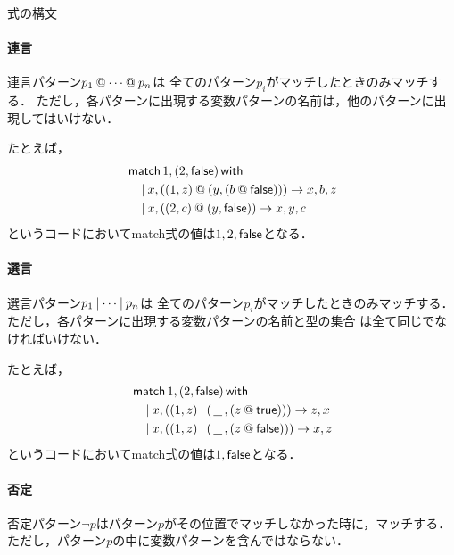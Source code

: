 \documentclass[a4paper,titlepage,report,disablejfam]{jsbook}
\begin{document}
\begin{resbonsiblesection}{式の構文}{\sakamoto}
\paragraph{連言}
連言パターン$p_1\mathbin{@} \cdots\mathbin{@} p_n$は
全てのパターン$p_i$がマッチしたときのみマッチする．
ただし，各パターンに出現する変数パターンの名前は，他のパターンに出現してはいけない．

たとえば，
\begin{equation}
\begin{aligned}
&\mathop{\mathsf{match}}1,(2,\mathsf{false})\mathop{\mathsf{with}} \\
&\quad \mathbin{|} x,((1, z)\mathbin{@}(y,(b\mathbin{@}\mathsf{false})))\rightarrow x,b,z \\
&\quad \mathbin{|} x,((2, c)\mathbin{@}(y,\mathsf{false}))\rightarrow x,y,c \\
\end{aligned}
\end{equation}
というコードにおいてmatch式の値は$1,2,\mathsf{false}$となる．

\paragraph{選言}
選言パターン$p_1\mathbin{|} \cdots\mathbin{|} p_n$は
全てのパターン$p_i$がマッチしたときのみマッチする．
ただし，各パターンに出現する変数パターンの名前と型の集合
は全て同じでなければいけない．

たとえば，
\begin{equation}
\begin{aligned}
&\mathop{\mathsf{match}}1,(2,\mathsf{false})\mathop{\mathsf{with}} \\
&\quad \mathbin{|} x,((1, z)\mathbin{|}(\,\underline{\hspace{0.7em}}\,,(z\mathbin{@}\mathsf{true})))\rightarrow z,x \\
&\quad \mathbin{|} x,((1, z)\mathbin{|}(\,\underline{\hspace{0.7em}}\,,(z\mathbin{@}\mathsf{false})))\rightarrow x,z \\
\end{aligned}
\end{equation}
というコードにおいてmatch式の値は$1,\mathsf{false}$となる．

\paragraph{否定}
否定パターン$\lnot p$はパターン$p$がその位置でマッチしなかった時に，マッチする．
ただし，パターン$p$の中に変数パターンを含んではならない．


\end{resbonsiblesection}
\end{document}
